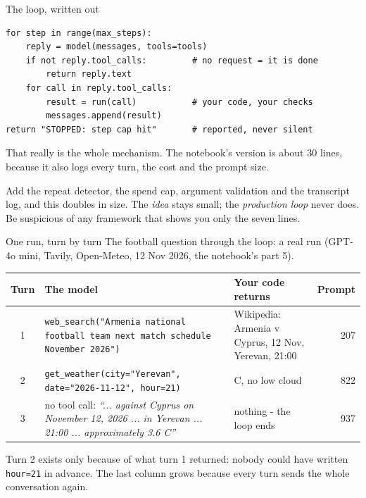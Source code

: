 \documentclass[aspectratio=169]{beamer}
\newcommand{\keybox}[1]{%
  \begin{tcolorbox}[colback=armblue!8, colframe=armblue, boxrule=0.6pt, arc=2pt]
  #1
  \end{tcolorbox}}
\newcommand{\watchbox}[1]{%
  \begin{tcolorbox}[colback=armorange!12, colframe=armorange, boxrule=0.6pt, arc=2pt]
  #1
  \end{tcolorbox}}
\begin{document}
\begin{frame}[fragile]{The loop, written out}
  \vspace{0.5em}
  \begin{lstlisting}
for step in range(max_steps):
    reply = model(messages, tools=tools)
    if not reply.tool_calls:         # no request = it is done
        return reply.text
    for call in reply.tool_calls:
        result = run(call)           # your code, your checks
        messages.append(result)
return "STOPPED: step cap hit"       # reported, never silent
\end{lstlisting}

  \vspace{0.5em}
  That really is the whole mechanism. The notebook's version is about 30 lines, because it also
  logs every turn, the cost and the prompt size.

  \vspace{0.6em}
  \watchbox{\small Add the repeat detector, the spend cap, argument validation and the transcript
  log, and this doubles in size. The \emph{idea} stays small; the \emph{production loop} never
  does. Be suspicious of any framework that shows you only the seven lines.}
\end{frame}

\begin{frame}{One run, turn by turn}
  \vspace{0.2em}
  {\small The football question through the loop: a real run (GPT-4o mini, Tavily, Open-Meteo, 12 Nov 2026,
  the notebook's part 5).}

  \vspace{0.3em}
  \begin{center}
  \footnotesize
  \begin{tabular}{c>{\raggedright\arraybackslash}p{}>{\raggedright\arraybackslash}p{}r}
    \toprule
    \textbf{Turn} & \textbf{The model} & \textbf{Your code returns} & \textbf{Prompt} \\
    \midrule
    1 & \texttt{web\_search("Armenia national football team next match schedule November 2026")}
      & Wikipedia: Armenia v Cyprus, 12 Nov, Yerevan, 21:00 & 207 \\
    2 & \texttt{get\_weather(city="Yerevan", date="2026-11-12", hour=21)} & 3.6 C, no low cloud & 822 \\
    3 & no tool call: \emph{``... against Cyprus on November 12, 2026 ... in Yerevan ... 21:00 ...
      approximately 3.6 C''} & nothing - the loop ends & 937 \\
    \bottomrule
  \end{tabular}
  \end{center}

  \vspace{0.1em}
  \keybox{\small Turn 2 exists only because of what turn 1 returned: nobody could have written
  \texttt{hour=21} in advance. The last column grows because every turn sends the whole conversation
  again.}
\end{frame}
\end{document}
